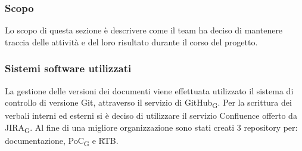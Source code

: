 \subsubsection{Scopo}
Lo scopo di questa sezione è descrivere come il team ha deciso di mantenere traccia delle attività e del loro risultato durante il corso del progetto. 

\subsubsection{Sistemi software utilizzati}
La gestione delle versioni dei documenti viene effettuata utilizzato il sistema di controllo di versione Git, attraverso il servizio di GitHub\textsubscript{G}. Per la scrittura dei verbali interni ed esterni si è deciso di utilizzare il servizio Confluence offerto da JIRA\textsubscript{G}.
Al fine di una migliore organizzazione sono stati creati 3 repository per: documentazione, PoC\textsubscript{G} e RTB.
